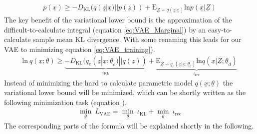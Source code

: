 \documentclass[12pt,DIV14,BCOR12mm,a4paper,footexclude,headinclude,halfparskip-,twoside,openright,openany,cleardoubleempty,idxtotoc,bibtotoc]{scrreprt} %
\numberwithin{equation}{chapter}
\begin{document}
\begin{align}
	 p(\underline{x}) \geq -D_{\textrm{KL}}(q(\underline{z}|\underline{x})||p(\underline{z}))+\textrm{E}_{\underline{Z}\backsim q(\underline{z}|\underline{x})}\textrm{ln}p(\underline{x}|\underline{Z})\label{eq:Variational_Lower_Bound}
\end{align}
The key benefit of the variational lower bound is the approximation of the difficult-to-calculate integral (equation \ref{eq:VAE_Marginal}) by an easy-to-calculate sample mean KL divergence. With some renaming this leads for our VAE to minimizing equation \ref{eq:VAE_training}).
\begin{align}
	 \textrm{ln}\ q(\underline{x};\underline{\theta}) \geq \underbrace{-D_{\textrm{KL}}(q_e(\underline{z}|\underline{x};\underline{\theta}_e)||q(\underline{z}))}_{\iota_{\textrm{KL}}}+\underbrace{\textrm{E}_{\underline{Z}\backsim q_e(\underline{z}|\underline{x};\underline{\theta}_e)}\textrm{ln}q(\underline{x}|\underline{Z};\underline{\theta}_d)}_{\iota_{\textrm{rec}}}\label{eq:VAE_training}
\end{align}
Instead of minimizing the hard to calculate parametric model $q(\underline{x};\underline{\theta})$ the variational lower bound will be minimized, which can be shortly written as the following minimization task (equation ).
\begin{align}
	\underset{\underline{\theta}}\min\ L_{\textrm{VAE}} = \underset{\underline{\theta}}\min\ \iota_{\textrm{KL}} + \underset{\underline{\theta}}\min\ \iota_{\textrm{rec}}\label{eq:VAE_Min}
\end{align}
The corresponding parts of the formula will be explained shortly in the following.
\end{document}

